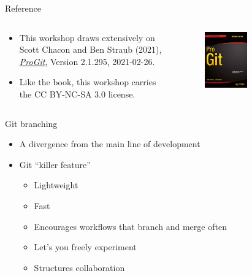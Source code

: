 \documentclass[handout]{beamer}
\begin{document}
\begin{frame}{Reference}
	\begin{columns}
	
		\begin{column}{0.5\textwidth}
			\begin{itemize}
				\item This workshop draws extensively on Scott Chacon and Ben Straub (2021), \href{https://git-scm.com/book/en/v2}{\textit{ProGit}}, Version 2.1.295, 2021-02-26. 
				\item Like the book, this workshop carries the CC BY-NC-SA 3.0 license.
			\end{itemize}
		\end{column}
		
		\begin{column}{0.5\textwidth}
			\begin{figure}
				\includegraphics[width=0.5\textwidth]{figures/progit_cover.png}
				\caption{}
			\end{figure}
		\end{column}
	
	\end{columns}
\end{frame}


\begin{frame}{Git branching}
	\begin{itemize}
		\item A divergence from the main line of development
		\item Git “killer feature”
		\begin{itemize}
			\item Lightweight
			\item Fast
			\item Encourages workflows that branch and merge often
			\item Let's you freely experiment
			\item Structures collaboration
		\end{itemize}
	\end{itemize}
\end{frame}
	
\end{document}

